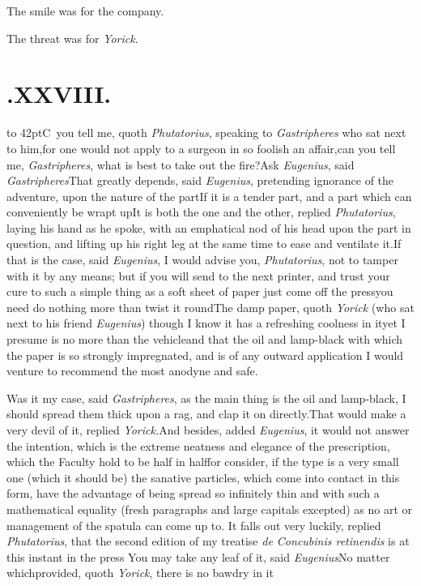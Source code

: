 \documentclass{article}
\begin{document}
\tsk The smile was for the company.

\tsk The threat was for \textit{Yorick}.

\bigskip
\section{.\enspace XXVIII.}

\lettrine{\hskip-3pt\hbox to 42pt{\Tsk C}}{\,} you tell me, quoth
\textit{Phuta\-torius}, speaking to \textit{Gastripheres} who sat next to him,\tsk for
one would not apply to a surgeon in so foolish an affair,\tsk can you tell me,
\textit{Gastripheres}, what is best to take out the fire?\tsk Ask \textit{Eugenius},
said \textit{Gastripheres}\tsk That greatly depends, said \textit{Eugenius},
pretending ignorance of the adventure, upon the nature of the part\tsk If it is a
tender part, and a part which can conveniently be wrapt up\tsk It is both the one
and the other, replied \textit{Phutatorius}, laying his hand as he spoke, with an
emphatical nod of his head upon the part in question, and lifting up his right leg
at the same time to ease and ventilate it.\tsh If that is the case, said
\textit{Eugenius}, I would advise you, \textit{Phutatorius}, not to tamper with it
by any means; but if you will send to the next printer, and trust your cure to such
a simple thing as a soft sheet of paper just come off the press\tsk you need do
nothing more than twist it round\tsk The damp paper, quoth \textit{Yorick} (who sat
next to his friend \textit{Eugenius}) though I know it has a refreshing coolness in
it\tsk yet I presume is no more than the vehicle\tsk and that the oil and lamp-black
with which the paper is so strongly impregnated,\break
{}
and is of any outward application I would venture to recommend
the most anodyne and safe.

Was it my case, said \textit{Gastripheres}, as the main thing is the oil and
lamp-black, I should spread them thick upon a rag, and clap it on directly.\tsh That
would make a very devil of it, replied \textit{Yorick.}\tsh And besides, added
\textit{Eugenius}, it would not answer the intention, which is the extreme neatness
and elegance of the prescription, which the Faculty hold to be half in half\tsk for
consider, if the type is a very small one (which it should be) the sanative
particles, which come into contact in this form, have the advantage of being spread
so infinitely thin and with such a mathematical equality (fresh paragraphs and
large capitals excepted) as no art or management of the spatula can come up to.
It falls out very luckily, replied \textit{Phutatorius}, that the second edition of
my treatise \textit{de Concubinis retinendis} is at this instant in the press\tsk
You may take any leaf of it, said \textit{Eugenius}\tsk No matter which\tsk provided,
quoth \textit{Yorick}, there is no bawdry in it\tsh
\end{document}

